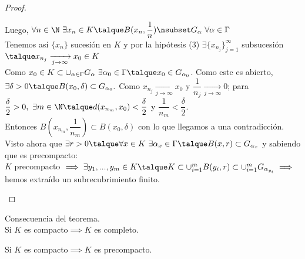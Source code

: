 \begin{teor}
\begin{proof}
\begin{itemize}
	 Luego, $\forall n\in\N\ \exists x_n\in K\talque B(x_n,\dfrac{1}{n})\nsubset G_\alpha\ \forall\alpha\in\Gamma$\\
	 Tenemos así $\{x_n\}$ sucesión en $K$ y por la hipótesis (3) $\exists \{x_{n_j}\}^\infty_{j=1}$ subsucesión$\talque x_{n_j} \xrightarrow [j\rightarrow\infty]{}x_0\in K$\\
	 Como $x_0\in K \subset\cup_{\alpha\in\Gamma}G_\alpha\ \exists \alpha_0\in\Gamma \talque x_0\in G_{\alpha_0}$. Como  este es abierto, $\exists \delta>0\talque B(x_0,\delta)\subset G_{\alpha_0}.$ Como $x_{n_j} 
	 \xrightarrow[j\rightarrow\infty]{}x_0$ y $\dfrac{1}{n_j}\xrightarrow[j\rightarrow\infty]{}0$; para 
	 $\dfrac{\delta}{2}>0,\ \exists m\in\N\talque d(x_{n_m},x_0)<\dfrac{\delta}{2}$
	  y $\dfrac{1}{n_m}<\dfrac{\delta}{2}$.\\
	 Entonces $B(x_{n_m},\dfrac{1}{n_m})\subset B(x_0,\delta)$ con lo que llegamos a una contradicción.\\	 
	 Visto ahora que $\exists r>0\talque\forall x\in K\ \exists \alpha_x\in\Gamma\talque B(x,r)\subset G_{\alpha_x}$ y sabiendo que es precompacto:\\
	 $K$ precompacto $\implies \exists y_1,...,y_m\in K\talque K\subset\cup^m_{i=1}B(y_i,r)\subset \cup^m_{i=1}G_{\alpha_{y_i}}\implies$hemos extraído un subrecubrimiento finito.
					
			\end{itemize}
		\end{proof}
	\end{teor}
	
	\begin{proposicion} Consecuencia del teorema.\\
		Si $K$ es compacto$\implies K$ es completo.
	\end{proposicion}
			
	\begin{proposicion}
		Si $K$ es compacto$\implies K$ es precompacto.
	\end{proposicion}
	
